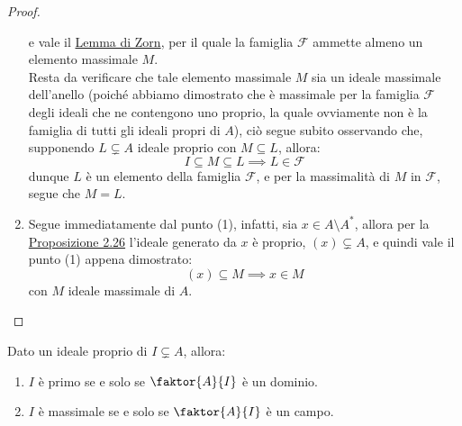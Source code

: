 \documentclass[11pt]{scrartcl}
\begin{document}
\begin{proof}
\begin{enumerate}
            e vale il \hyperref[zorn]{Lemma di Zorn}, per il quale la famiglia $\mathcal{F}$ ammette almeno un elemento massimale $M$. \\
            Resta da verificare che tale elemento massimale $M$ sia un ideale massimale dell'anello (poiché abbiamo dimostrato che è massimale per la famiglia $\mathcal{F}$ degli ideali che ne contengono uno proprio,
            la quale ovviamente non è la famiglia di tutti gli ideali propri di $A$), ciò segue subito osservando che,
            supponendo $L \subsetneq A$ ideale proprio con $M \subseteq L$, allora:
                \[ I \subseteq M \subseteq L \implies L \in \mathcal{F}
                    \]
            dunque $L$ è un elemento della famiglia $\mathcal{F}$, e per la massimalità di $M$ in $\mathcal{F}$, segue che $M = L$.
        \item Segue immediatamente dal punto (1), infatti, sia $x \in A \setminus A^*$, allora per la \hyperref[2.26]{Proposizione 2.26} l'ideale generato da $x$ è proprio,
        $(x) \subsetneq A$, e quindi vale il punto (1) appena dimostrato:
            \[ (x) \subseteq M \implies x \in M
                \]
        con $M$ ideale massimale di $A$.
    \end{enumerate}
\end{proof}

\begin{proposition}
    \label{2.56}
    Dato un ideale proprio di $I \subsetneq A$, allora:
    \begin{enumerate}[(1)]
        \item $I$ è primo se e solo se $\faktor{A}{I}$ è un dominio.
        \item $I$ è massimale se e solo se $\faktor{A}{I}$ è un campo.
    \end{enumerate}
\end{proposition}
\end{document}
